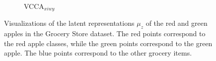 \begin{figure}[t]
\begin{subfigure}[b]{0.3\textwidth}
         \caption{VCCA$_{x i w y}$}
         \label{fig:pca_vcca_xiwy_apples}
     \end{subfigure}
    \vspace{-2mm} 
    \caption{Visualizations of the latent representations $\mu_{z}$ of the red and green apples in the Grocery Store dataset. The red points correspond to the red apple classes, while the green points correspond to the green apple. The blue points correspond to the other grocery items. 
    }
    \label{fig:2d_visualizations_pca_apples}
    \vspace{-3mm}
\end{figure}
